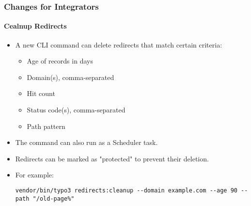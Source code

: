%

\begin{frame}[fragile]
	\frametitle{Changes for Integrators}
	\framesubtitle{Cealnup Redirects}


	\begin{itemize}
		\item A new CLI command can delete redirects that match certain criteria:
			\begin{itemize}
				\item Age of records in days
				\item Domain(s), comma-separated
				\item Hit count
				\item Status code(s), comma-separated
				\item Path pattern
			\end{itemize}
		\item The command can also run as a Scheduler task.
		\item Redirects can be marked as "protected" to prevent their deletion.
		\item For example:
\begin{lstlisting}
vendor/bin/typo3 redirects:cleanup --domain example.com --age 90 --path "/old-page%"
\end{lstlisting}

	\end{itemize}
\end{frame}

